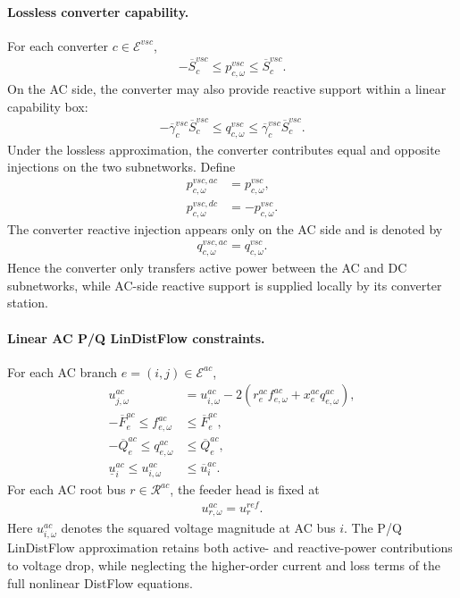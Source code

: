 \paragraph{Lossless converter capability.}
For each converter \(c\in\mathcal{E}^{vsc}\),
\begin{align}
 -\overline S_c^{vsc} \le p_{c,\omega}^{vsc} \le \overline S_c^{vsc}.
\label{eq:10b-vsc-bounds}
\end{align}
On the AC side, the converter may also provide reactive support within a linear capability box:
\begin{align}
-\overline\gamma_c^{vsc}\overline S_c^{vsc}
\le q_{c,\omega}^{vsc} \le
\overline\gamma_c^{vsc}\overline S_c^{vsc}.
\label{eq:10b-vsc-reactive-bounds}
\end{align}
Under the lossless approximation, the converter contributes equal and opposite injections on the two subnetworks. Define
\begin{align}
p_{c,\omega}^{vsc,ac} &= p_{c,\omega}^{vsc},
\label{eq:10b-vsc-ac-inj}\\
p_{c,\omega}^{vsc,dc} &= -p_{c,\omega}^{vsc}.
\label{eq:10b-vsc-dc-inj}
\end{align}
The converter reactive injection appears only on the AC side and is denoted by
\begin{align}
q_{c,\omega}^{vsc,ac} = q_{c,\omega}^{vsc}.
\label{eq:10b-vsc-ac-reactive-inj}
\end{align}
Hence the converter only transfers active power between the AC and DC subnetworks, while AC-side reactive support is supplied locally by its converter station.

\paragraph{Linear AC P/Q LinDistFlow constraints.}
For each AC branch \(e=(i,j)\in\mathcal{E}^{ac}\),
\begin{align}
u_{j,\omega}^{ac} &= u_{i,\omega}^{ac} - 2\left(r_e^{ac} f_{e,\omega}^{ac} + x_e^{ac} q_{e,\omega}^{ac}\right),
\label{eq:10b-ac-flow}\\
-\overline F_e^{ac} \le f_{e,\omega}^{ac} &\le \overline F_e^{ac},
\label{eq:10b-ac-flow-bound}\\
-\overline Q_e^{ac} \le q_{e,\omega}^{ac} &\le \overline Q_e^{ac},
\label{eq:10b-ac-reactive-flow-bound}\\
\underline u_i^{ac} \le u_{i,\omega}^{ac} &\le \overline u_i^{ac}.
\label{eq:10b-ac-voltage-bound}
\end{align}
For each AC root bus \(r\in\mathcal{R}^{ac}\), the feeder head is fixed at
\begin{align}
u_{r,\omega}^{ac} = u_r^{ref}.
\label{eq:10b-ac-root-voltage}
\end{align}
Here \(u_{i,\omega}^{ac}\) denotes the squared voltage magnitude at AC bus \(i\). The P/Q LinDistFlow approximation retains both active- and reactive-power contributions to voltage drop, while neglecting the higher-order current and loss terms of the full nonlinear DistFlow equations.

